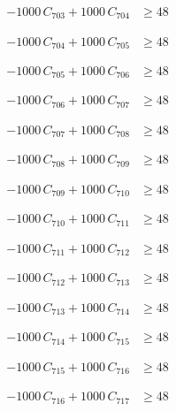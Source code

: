 \documentclass[a4paper,11pt]{article}
\begin{document}
\begin{align}
-1000\,C_{703} + 1000\,C_{704} &\geq 48 \nonumber
\end{align}

\begin{align}
-1000\,C_{704} + 1000\,C_{705} &\geq 48 \nonumber
\end{align}

\begin{align}
-1000\,C_{705} + 1000\,C_{706} &\geq 48 \nonumber
\end{align}

\begin{align}
-1000\,C_{706} + 1000\,C_{707} &\geq 48 \nonumber
\end{align}

\begin{align}
-1000\,C_{707} + 1000\,C_{708} &\geq 48 \nonumber
\end{align}

\begin{align}
-1000\,C_{708} + 1000\,C_{709} &\geq 48 \nonumber
\end{align}

\begin{align}
-1000\,C_{709} + 1000\,C_{710} &\geq 48 \nonumber
\end{align}

\begin{align}
-1000\,C_{710} + 1000\,C_{711} &\geq 48 \nonumber
\end{align}

\begin{align}
-1000\,C_{711} + 1000\,C_{712} &\geq 48 \nonumber
\end{align}

\begin{align}
-1000\,C_{712} + 1000\,C_{713} &\geq 48 \nonumber
\end{align}

\begin{align}
-1000\,C_{713} + 1000\,C_{714} &\geq 48 \nonumber
\end{align}

\begin{align}
-1000\,C_{714} + 1000\,C_{715} &\geq 48 \nonumber
\end{align}

\begin{align}
-1000\,C_{715} + 1000\,C_{716} &\geq 48 \nonumber
\end{align}

\begin{align}
-1000\,C_{716} + 1000\,C_{717} &\geq 48 \nonumber
\end{align}
\end{document}
